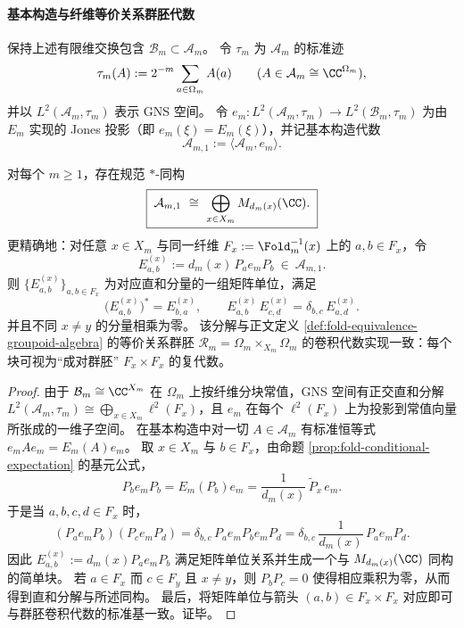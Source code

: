 \paragraph{基本构造与纤维等价关系群胚代数}
保持上述有限维交换包含 \(\mathcal B_m\subset \mathcal A_m\)。
令 \(\tau_m\) 为 \(\mathcal A_m\) 的标准迹
\[
\tau_m(A):=2^{-m}\sum_{a\in\Omega_m}A(a)\qquad(A\in\mathcal A_m\cong \CC^{\Omega_m}),
\]
并以 \(L^2(\mathcal A_m,\tau_m)\) 表示 GNS 空间。
令 \(e_m:L^2(\mathcal A_m,\tau_m)\to L^2(\mathcal B_m,\tau_m)\) 为由 \(E_m\) 实现的 Jones 投影（即 \(e_m(\xi)=E_m(\xi)\)），并记基本构造代数
\[
\mathcal A_{m,1}:=\langle \mathcal A_m,e_m\rangle.
\]

\begin{theorem}\label{thm:op-algebra-fold-basic-construction-pair-groupoid}
对每个 \(m\ge 1\)，存在规范 \(\ast\)-同构
\[
\boxed{\;\mathcal A_{m,1}\ \cong\ \bigoplus_{x\in X_m} M_{d_m(x)}(\CC).\;}
\]
更精确地：对任意 \(x\in X_m\) 与同一纤维 \(F_x:=\Fold_m^{-1}(x)\) 上的 \(a,b\in F_x\)，令
\[
E^{(x)}_{a,b}:=d_m(x)\,P_a e_m P_b\ \in\ \mathcal A_{m,1}.
\]
则 \(\{E^{(x)}_{a,b}\}_{a,b\in F_x}\) 为对应直和分量的一组矩阵单位，满足
\[
\bigl(E^{(x)}_{a,b}\bigr)^\ast=E^{(x)}_{b,a},
\qquad
E^{(x)}_{a,b}\,E^{(x)}_{c,d}=\delta_{b,c}\,E^{(x)}_{a,d}.
\]
并且不同 \(x\neq y\) 的分量相乘为零。
该分解与正文定义 \ref{def:fold-equivalence-groupoid-algebra} 的等价关系群胚 \(\mathcal R_m=\Omega_m\times_{X_m}\Omega_m\) 的卷积代数实现一致：每个块可视为“成对群胚” \(F_x\times F_x\) 的复代数。
\end{theorem}

\begin{proof}
由于 \(\mathcal B_m\cong \CC^{X_m}\) 在 \(\Omega_m\) 上按纤维分块常值，GNS 空间有正交直和分解
\(
L^2(\mathcal A_m,\tau_m)\cong \bigoplus_{x\in X_m}\ell^2(F_x)
\)，且 \(e_m\) 在每个 \(\ell^2(F_x)\) 上为投影到常值向量所张成的一维子空间。
在基本构造中对一切 \(A\in\mathcal A_m\) 有标准恒等式 \(e_mAe_m=E_m(A)e_m\)。
取 \(x\in X_m\) 与 \(b\in F_x\)，由命题 \ref{prop:fold-conditional-expectation} 的基元公式，
\[
P_b e_m P_b
=E_m(P_b)e_m
=\frac{1}{d_m(x)}\,\widetilde P_x\,e_m.
\]
于是当 \(a,b,c,d\in F_x\) 时，
\[
(P_a e_m P_b)(P_c e_m P_d)
=\delta_{b,c}\,P_a e_m P_b e_m P_d
=\delta_{b,c}\,\frac{1}{d_m(x)}\,P_a e_m P_d.
\]
因此 \(E^{(x)}_{a,b}:=d_m(x)P_a e_m P_b\) 满足矩阵单位关系并生成一个与 \(M_{d_m(x)}(\CC)\) 同构的简单块。
若 \(a\in F_x\) 而 \(c\in F_y\) 且 \(x\neq y\)，则 \(P_bP_c=0\) 使得相应乘积为零，从而得到直和分解与所述同构。
最后，将矩阵单位与箭头 \((a,b)\in F_x\times F_x\) 对应即可与群胚卷积代数的标准基一致。证毕。
\end{proof}

